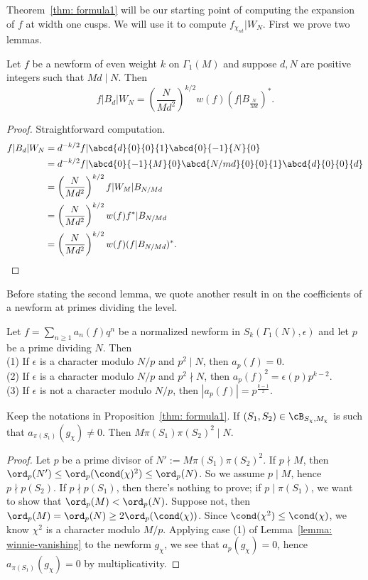 \documentclass [11pt, proquest] {uwthesis}[2015/03/03]
\begin{document}
Theorem~\ref{thm: formula1} will be our starting point of computing the expansion of $f$ at width one cusps. 
We will use it to compute $f_{\chi_{nt}} | W_N$.  First we prove two lemmas. 
\begin{Lemma} \label{lemma: bdwn}
Let $f$ be a newform of even weight $k$ on $\Gamma_1(M)$ and suppose $d, N$ are positive integers such that $Md \mid N$. Then
   $$f| B_d|W_N = \left(\frac{N}{Md^2} \right)^{k/2}  w(f)  (f|B_{\frac{N}{Md}})^{*}.$$
\end{Lemma}
\begin{proof} Straightforward computation.
\begin{align*}
f |B_d | W_N & = d^{-k/2} f | \abcd{d}{0}{0}{1} \abcd{0}{-1}{N}{0} \\ 
& = d^{-k/2} f| \abcd{0}{-1}{M}{0} \abcd{N/md}{0}{0}{1} \abcd{d}{0}{0}{d} \\
& = \left( \frac{N}{Md^2} \right)^{k/2} f | W_M | B_{N/Md} \\
& = \left( \frac{N}{Md^2} \right)^{k/2} w(f) f^* | B_{N/Md} \\ 
& = \left( \frac{N}{Md^2} \right)^{k/2} w(f) (f | B_{N/Md})^*.
\end{align*}
\end{proof}

Before stating the second lemma, we quote another result in \cite{li1975newforms} on the coefficients of a newform at primes dividing the level.
\begin{Lemma}\cite[Theorem 3 (iii)]{li1975newforms}  \label{lemma: winnie-vanishing}
Let $f = \sum_{n \geq 1} a_n(f) q^n$ be a normalized newform in $S_k(\Gamma_1(N), \epsilon)$ and let $p$ be a prime dividing $N$.  Then \\
(1) If $\epsilon$ is a character modulo $N/p$ and  $p^2 \mid N$, then $a_p(f) = 0$. \\ 
(2) If $\epsilon$ is a character modulo $N/p$ and  $p^2 \nmid N$, then $a_p(f)^2 = \epsilon(p) p^{k-2}$. \\ 
(3) If $\epsilon$ is not a character modulo $N/p$, then $|a_p(f)| = p^{\frac{k-1}{2}}$.
\end{Lemma}


\begin{Lemma} \label{lemma: well-definedness}
Keep the notations in Proposition~\ref{thm: formula1}. If $(S_1, S_2) \in \cB_{S_\chi,M_\chi}$ is such that $a_{\pi(S_1)}(g_\chi) \neq 0$. Then 
$M \pi (S_1) \pi(S_2)^2 \mid N$.
\end{Lemma}

\begin{proof}
Let $p$ be a prime divisor of $N' := M \pi(S_1) \pi(S_2)^2$. If $p \nmid M$, then $\ord_p(N') \leq \ord_p(\cond(\chi)^2) \leq \ord_p(N)$. So we assume $p \mid M$, hence $p \nmid p(S_2)$. If $p \nmid p(S_1)$, then there's nothing to prove; 
if $p \mid \pi(S_1)$, we want to show that $\ord_p(M) < \ord_p(N)$. Suppose not, then $\ord_p(M) = \ord_p(N) \geq 2 \ord_p(\cond(\chi))$. Since $\cond(\chi^2) \leq \cond(\chi)$, we know $\chi^2$ is a character modulo $M/p$. Applying case (1) of Lemma~\ref{lemma: winnie-vanishing} to the newform $g_\chi$, we see that $a_{p}(g_\chi) = 0$, hence $a_{\pi(S_1)}(g_\chi) = 0$ by multiplicativity.
\end{proof}
\end{document}
